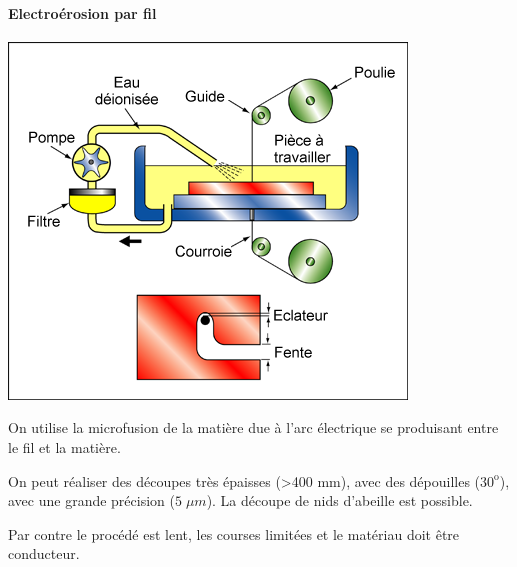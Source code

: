 \documentclass[11pt,oneside]{article}
\begin{document}
\paragraph*{Electroérosion par fil}
\begin{minipage}[c]{.25\linewidth}
\begin{center}
\includegraphics[width=.9\textwidth]{png/fil}
\end{center}
\end{minipage} \hfill
\begin{minipage}[c]{.6\linewidth}
On utilise la microfusion de la matière due à l'arc électrique se produisant entre le fil et la matière.

On peut réaliser des découpes très épaisses (>400 mm), avec des dépouilles ($30^{\text{o}}$), avec une grande précision ($5\; \mu m$). La découpe de nids d'abeille est possible.

Par contre le procédé est lent, les courses limitées et le matériau doit être conducteur.
\end{minipage}
\end{document}
